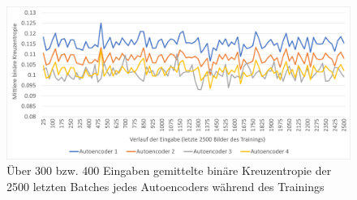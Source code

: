 \begin{figure}[htbp]
    \centering
    \begin{center}

        \end{center}
\end{figure}


\begin{figure}[htbp]
    \centering
    \includegraphics[width=\textwidth]{bilder/training_diagram_last2500.png}
    \caption{Über 300 bzw. 400 Eingaben gemittelte binäre Kreuzentropie der 2500 letzten Batches jedes Autoencoders während des Trainings}
    \label{fig:training_loss_2500}
\end{figure}


